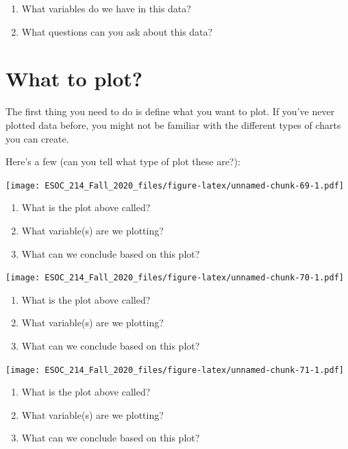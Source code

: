 \documentclass[
]{book}
\begin{document}
\begin{enumerate}
\def\labelenumi{\arabic{enumi})}
\item
  What variables do we have in this data?
\item
  What questions can you ask about this data?
\end{enumerate}

\hypertarget{what-to-plot}{%
\section{What to plot?}\label{what-to-plot}}

The first thing you need to do is define what you want to plot. If you've never plotted data before, you might not be familiar with the different types of charts you can create.

Here's a few (can you tell what type of plot these are?):

\texttt{[image: ESOC\_214\_Fall\_2020\_files/figure-latex/unnamed-chunk-69-1.pdf]}

\begin{enumerate}
\def\labelenumi{\arabic{enumi})}
\item
  What is the plot above called?
\item
  What variable(s) are we plotting?
\item
  What can we conclude based on this plot?
\end{enumerate}

\texttt{[image: ESOC\_214\_Fall\_2020\_files/figure-latex/unnamed-chunk-70-1.pdf]}

\begin{enumerate}
\def\labelenumi{\arabic{enumi})}
\item
  What is the plot above called?
\item
  What variable(s) are we plotting?
\item
  What can we conclude based on this plot?
\end{enumerate}

\texttt{[image: ESOC\_214\_Fall\_2020\_files/figure-latex/unnamed-chunk-71-1.pdf]}

\begin{enumerate}
\def\labelenumi{\arabic{enumi})}
\item
  What is the plot above called?
\item
  What variable(s) are we plotting?
\item
  What can we conclude based on this plot?
\end{enumerate}
\end{document}
